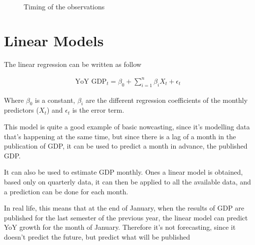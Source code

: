 \documentclass[12pt,a4paper,oneside]{book}
\newcommand{\ImageWidth}{11cm}
\begin{document}
\begin{figure}[H]
     \centering \footnotesize
{}
    \caption{Timing of the observations}
    \label{fig:time of the data}
\end{figure}


\section{Linear Models}

The linear regression can be written as follow

\begin{eqnarray}
    \text{YoY GDP}_{t} = \beta_0 + \sum^n_{i = 1}
       \beta_{i} X_{t} + \epsilon_t 
\end{eqnarray}

Where $\beta_{0}$ is a constant, $\beta_{i}$  are the different regression coefficients of the monthly predictors ($X_{t}$) and $\epsilon_t$ is the error term.

This model is quite a good example of basic nowcasting, since it's modelling data that's happening at the same time, but since there is a lag of a month in the publication of GDP, it can be used to predict a month in advance, the published GDP.

It can also be used to estimate GDP monthly. Ones a linear model is obtained, based only on quarterly data, it can then be applied to all the available data, and a prediction can be done for each month.

In real life, this means that at the end of January, when the results of GDP are published for the last semester of the previous year, the linear model can predict YoY growth for the month of January. Therefore it's not forecasting, since it doesn't predict the future, but predict what will be published
\end{document}
